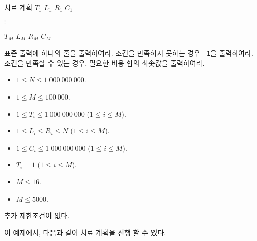 \begin{problem}{치료 계획}
	$T_1$ $L_1$ $R_1$ $C_1$
	
	$\vdots$
	
	$T_M$ $L_M$ $R_M$ $C_M$
	
	\OutputFile
	
	
	표준 출력에 하나의 줄을 출력하여라. 조건을 만족하지 못하는 경우 \texttt{-1}을 출력하여라. 조건을 만족할 수 있는 경우, 필요한 비용 합의 최솟값을 출력하여라.
	
	
	

	\Constraints


	\begin{itemize}
		
		\item $1 \le N \le 1\ 000\ 000\ 000$.
		\item $1 \le M \le 100\ 000$.
		\item $1 \le T_i \le 1\ 000\ 000\ 000$ ($1 \le i \le M$).
		\item $1 \le L_i \le R_i \le N$ ($1 \le i \le M$).
		\item $1 \le C_i \le 1\ 000\ 000\ 000$ ($1 \le i \le M$).
	\end{itemize}


	\begin{itemize}
		\item $T_i = 1$ ($1 \le i \le M$).
	\end{itemize}

	
	\begin{itemize}
		\item $M \le 16$.
	\end{itemize}


	\begin{itemize}
		\item $M \le 5000$.
	\end{itemize}
	
	
	추가 제한조건이 없다.
		
	\Examples
		
	\begin{example}
\end{example}

	이 예제에서, 다음과 같이 치료 계획을 진행 할 수 있다.


\end{problem}
